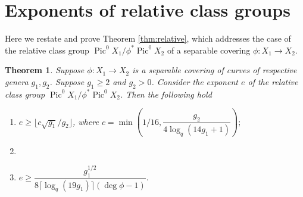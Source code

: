 \documentclass[11pt]{amsart}
\newcommand{\bkedit}[1]{{\color{blue} \sf  #1}}
\DeclareMathOperator{\Pic}{Pic}
\newtheorem{theorem}{Theorem}[section]
\theoremstyle{definition}
\theoremstyle{remark}
\begin{document}
\section{Exponents of relative class groups}\label{sec:relative}

Here we restate and prove Theorem \ref{thm:relative}, which addresses the case of the relative class group $\Pic^0 X_1/\phi^{*}\Pic^0 X_2$ of a separable covering $\phi: X_1 \to X_2$. %
\begin{theorem}\label{thm:relative-full}
    Suppose $\phi:X_1 \to X_2$ is a separable covering of curves of respective genera $g_1, g_2$. Suppose $g_1 \geqslant 2$ and $g_2>0$. Consider the exponent $e$ of the relative class group $\Pic^0 X_1/\phi^{*}\Pic^0 X_2$. Then the following hold
\begin{enumerate}
    \item\label{case:highdegr} $e \geqslant \lfloor c \sqrt{g_1}/g_2 \rfloor$, where $c=\min \left(1/16, \dfrac{g_2}{4\log_q(14g_1+1)}\right);$
    \item[]
    \item $e \geqslant \dfrac{g_1^{1/2}}{8 \lceil\log_q(19g_1)\rceil (\deg \phi -1)}.$\label{case:lowdegr}
\end{enumerate}
\end{theorem}
\end{document}
